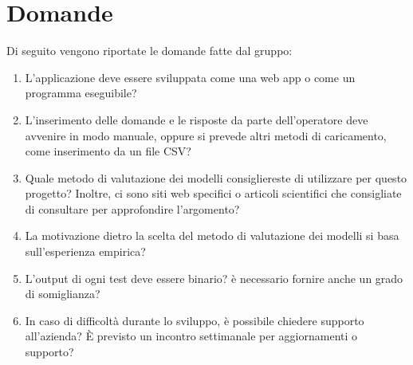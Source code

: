 \documentclass[a4paper, 12pt]{article}
\begin{document}
\section{Domande}
Di seguito vengono riportate le domande fatte dal gruppo:
\begin{enumerate}
    \item L'applicazione deve essere sviluppata come una web app o come un programma eseguibile?
    \item L'inserimento delle domande e le risposte da parte dell'operatore deve avvenire in modo manuale, oppure si prevede altri metodi di caricamento, come inserimento da un file CSV?
    \item Quale metodo di valutazione dei modelli consigliereste di utilizzare per questo progetto? Inoltre, ci sono siti web specifici o articoli scientifici che consigliate di consultare per approfondire l'argomento?
    \item La motivazione dietro la scelta del metodo di valutazione dei modelli si basa sull'esperienza empirica? 
    \item L'output di ogni test deve essere binario? è necessario fornire anche un grado di somiglianza?
    \item In caso di difficoltà durante lo sviluppo, è possibile chiedere supporto all'azienda? È previsto un incontro settimanale per aggiornamenti o supporto?
\end{enumerate}
\end{document}
